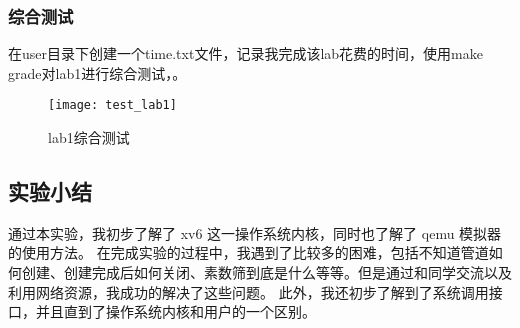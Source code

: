\subsubsection{综合测试}

在user目录下创建一个time.txt文件，记录我完成该lab花费的时间，使用make grade对lab1进行综合测试，。

\begin{figure}[!htb]
	\centering
	\texttt{[image: test\_lab1]}
	\caption{lab1综合测试}
	\label{fig:test_lab1}
\end{figure}

\subsection{实验小结}

通过本实验，我初步了解了 xv6 这一操作系统内核，同时也了解了 qemu 模拟器的使用方法。
在完成实验的过程中，我遇到了比较多的困难，包括不知道管道如何创建、创建完成后如何关闭、素数筛到底是什么等等。但是通过和同学交流以及利用网络资源，我成功的解决了这些问题。
此外，我还初步了解到了系统调用接口，并且直到了操作系统内核和用户的一个区别。




